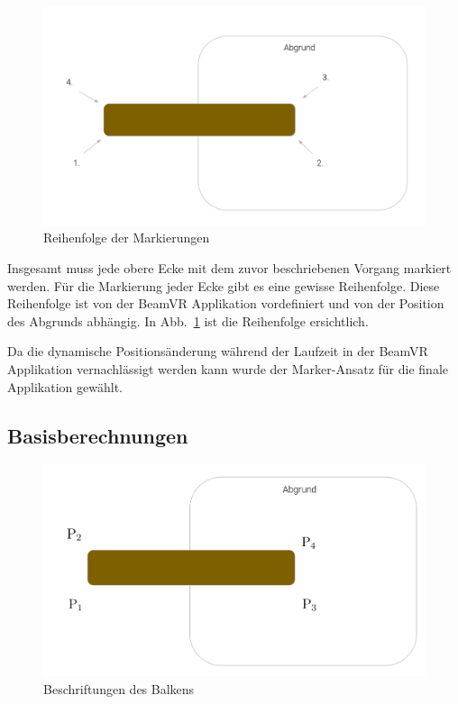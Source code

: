 \begin{figure}
    \centering
    \includegraphics[scale=0.25]{pics/beam-marking-sequence}
    \caption{Reihenfolge der Markierungen}
    \label{fig:beam-marking-sequence}
\end{figure}

Insgesamt muss jede obere Ecke mit dem zuvor beschriebenen Vorgang markiert werden.
Für die Markierung jeder Ecke gibt es eine gewisse Reihenfolge.
Diese Reihenfolge ist von der BeamVR Applikation vordefiniert und von der Position des Abgrunds abhängig.
In Abb.~\ref{fig:beam-marking-sequence} ist die Reihenfolge ersichtlich.

Da die dynamische Positionsänderung während der Laufzeit in der BeamVR Applikation vernachlässigt werden kann wurde der Marker-Ansatz für die finale Applikation gewählt.

\subsection{Basisberechnungen}
\label{subsec:basisberechnungen}

\begin{figure}
    \centering
    \includegraphics[scale=0.25]{pics/beam-point-labeling}
    \caption{Beschriftungen des Balkens}
    \label{fig:beam-point-labeling}
\end{figure}


